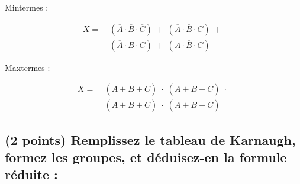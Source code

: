 \documentclass[11pt,a4paper]{article}
\begin{document}
\begin{table}[!ht]
\begin{minipage}{0.50\textwidth}
\bigskip

Mintermes :

\vspace*{-0.5cm}

\begin{equation*}
    \begin{split}
X = \; & ( \overline{A} \cdot \overline{B} \cdot \overline{C}) \; + \; ( \overline{A} \cdot \overline{B} \cdot C) \; + \; \\
    & ( \overline{A} \cdot B \cdot C ) \; + \; ( A \cdot \overline{B} \cdot C )
    \end{split}
\end{equation*}

\smallskip

Maxtermes :

\vspace*{-0.5cm}

\begin{equation*}
    \begin{split}
X = \; & ( A + \overline{B} + C ) \; \cdot \; ( \overline{A} + B + C ) \; \cdot \; \\
    & ( \overline{A} + \overline{B} + C ) \; \cdot \; ( \overline{A} + \overline{B} + \overline{C} )
    \end{split}
\end{equation*}


\vspace*{2cm}


  \end{minipage}
\end{table}


\bigskip


\subsection{(2 points) Remplissez le tableau de Karnaugh, formez les groupes, et déduisez-en la formule réduite : }

\end{document}
